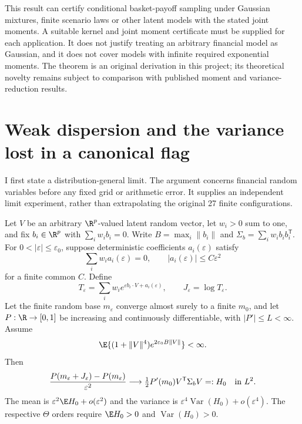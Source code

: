 This result can certify conditional basket-payoff sampling under Gaussian
mixtures, finite scenario laws or other latent models with the stated joint
moments. A suitable kernel and joint moment certificate must be supplied
for each application. It does not justify treating an arbitrary financial
model as Gaussian, and it does not cover models with infinite required
exponential moments. The theorem is an original derivation in this
project; its theoretical novelty remains subject to comparison with
published moment and variance-reduction results.

\section{Weak dispersion and the variance lost in a canonical flag}
\label{sec:weak-dispersion}

I first state a distribution-general limit. The argument concerns
financial random variables before any fixed grid or arithmetic error.
It supplies an independent limit experiment, rather than extrapolating
the original 27 finite configurations.

\begin{theorem}\label{thm:general-weak-dispersion}
Let $V$ be an arbitrary $\R^p$-valued latent random vector, let
$w_i>0$ sum to one, and fix $b_i\in\R^p$ with
$\sum_iw_i b_i=0$. Write $B=\max_i\|b_i\|$ and
$\Sigma_b=\sum_iw_i b_i b_i^{\mathsf T}$.
For $0<|\varepsilon|\leq\varepsilon_0$, suppose deterministic coefficients
$a_i(\varepsilon)$ satisfy
\begin{equation}
 \sum_iw_i a_i(\varepsilon)=0,\qquad
 |a_i(\varepsilon)|\leq C\varepsilon^2
\end{equation}
for a finite common $C$. Define
\begin{equation}
 T_\varepsilon=\sum_iw_i
        e^{\varepsilon b_i\cdot V+a_i(\varepsilon)},\qquad
 J_\varepsilon=\log T_\varepsilon.
\end{equation}
Let the finite random base $m_\varepsilon$ converge almost surely to
a finite $m_0$, and let $P:\R\to[0,1]$ be increasing and continuously
differentiable, with $|P'|\leq L<\infty$. Assume
\begin{equation}\label{eq:general-dispersion-integrability}
 \E\{(1+\|V\|^4)
                 e^{2\varepsilon_0B\|V\|}\}<\infty.
\end{equation}
Then
\begin{equation}\label{eq:general-weak-L2}
 \frac{P(m_\varepsilon+J_\varepsilon)-P(m_\varepsilon)}
      {\varepsilon^2}
 \longrightarrow
 \tfrac12P'(m_0)V^{\mathsf T}\Sigma_b V=:H_0
 \quad\hbox{in }L^2.
\end{equation}
The mean is $\varepsilon^2\E H_0+o(\varepsilon^2)$ and the variance is
$\varepsilon^4\operatorname{Var}(H_0)+o(\varepsilon^4)$.
The respective $\Theta$ orders require
$\E H_0>0$ and $\operatorname{Var}(H_0)>0$.
\end{theorem}

